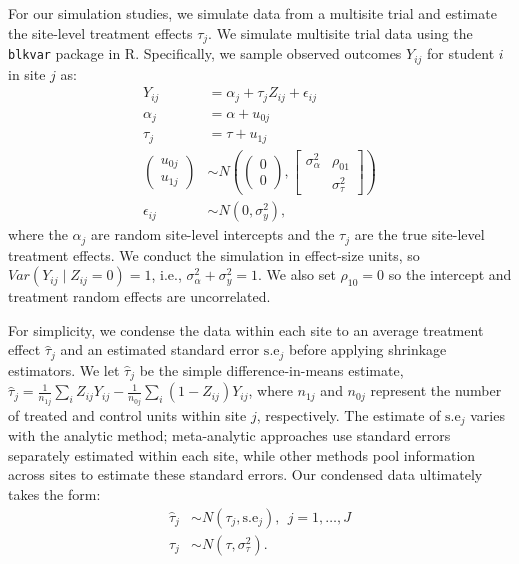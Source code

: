 \documentclass[]{article}
\begin{document}
For our simulation studies, we simulate data from a multisite trial and estimate the site-level treatment effects $\tau_j$.
We simulate multisite trial data using the \texttt{blkvar} package in R.
Specifically, we sample observed outcomes $Y_{ij}$ for student $i$ in site $j$ as:
\begin{align*}
	Y_{ij} &= \alpha_j + \tau_j Z_{ij} + \epsilon_{ij} \\
	\alpha_j &= \alpha + u_{0j} \\
	\tau_j &= \tau + u_{1j} \\
	\begin{pmatrix}
		u_{0j} \\ u_{1j}
	\end{pmatrix} &\sim N\left(
	\begin{pmatrix}
		0 \\ 0
	\end{pmatrix}, 
	\begin{bmatrix}
		\sigma^2_\alpha & \rho_{01} \\  & \sigma^2_\tau
	\end{bmatrix}\right) \\
	\epsilon_{ij} &\sim N(0, \sigma^2_y) ,
\end{align*}
where the $\alpha_j$ are random site-level intercepts and the $\tau_j$ are the true site-level treatment effects.
We conduct the simulation in effect-size units, so $Var(Y_{ij} \mid Z_{ij}=0)=1$, i.e., $\sigma^2_\alpha + \sigma^2_y = 1$.
We also set $\rho_{10}=0$ so the intercept and treatment random effects are uncorrelated.

For simplicity, we condense the data within each site to an average treatment effect $\hat{\tau}_j$ and an estimated standard error $\text{s.e}_j$ before applying shrinkage estimators.
We let $\hat{\tau}_j$ be the simple difference-in-means estimate, $\hat{\tau}_j = \frac{1}{n_{1j}} \sum_i Z_{ij}Y_{ij} - \frac{1}{n_{0j}} \sum_i (1-Z_{ij})Y_{ij}$, where $n_{1j}$ and $n_{0j}$ represent the number of treated and control units within site $j$, respectively.
The estimate of $\text{s.e}_j$ varies with the analytic method; meta-analytic approaches use standard errors separately estimated within each site, while other methods pool information across sites to estimate these standard errors.
Our condensed data ultimately takes the form:
\begin{align*}
    \hat{\tau}_j &\sim N(\tau_j, \text{s.e}_j), \ \ j=1,\dots,J \\
    \tau_j &\sim N(\tau, \sigma_\tau^2).
\end{align*}
\end{document}
